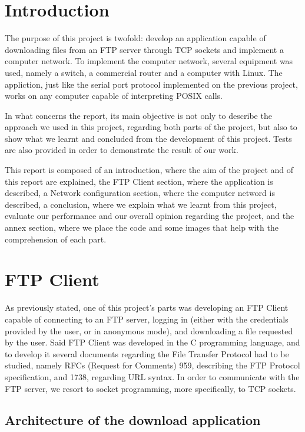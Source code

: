 \documentclass[11pt,a4paper,reqno]{article}
\numberwithin{equation}{section}
\begin{document}
\section{Introduction}

	The purpose of this project is twofold: develop an application capable of downloading files from an FTP server through TCP sockets and implement a computer network. To implement the computer network, several equipment was used, namely a switch, a commercial router and a computer with Linux. The appliction, just like the serial port protocol implemented on the previous project, works on any computer capable of interpreting POSIX calls.
	
	In what concerns the report, its main objective is not only to describe the approach we used in this project, regarding both parts of the project, but also to show what we learnt and concluded from the development of this project. Tests are also provided in order to demonstrate the result of our work.
	
	This report is composed of an introduction, where the aim of the project and of this report are explained, the FTP Client section, where the application is described, a Network configuration section, where the computer netword is described, a conclusion, where we explain what we learnt from this project, evaluate our performance and our overall opinion regarding the project, and the annex section, where we place the code and some images that help with the comprehension of each part.

	\section{FTP Client}

	As previously stated, one of this project’s parts was developing an FTP Client capable of connecting to an FTP server, logging in (either with the credentials provided by the user, or in anonymous mode), and downloading a file requested by the user. Said FTP Client was developed in the C programming language, and to develop it several documents regarding the File Transfer Protocol had to be studied, namely RFCs (Request for Comments) 959, describing the FTP Protocol specification, and 1738, regarding URL syntax. In order to communicate with the FTP server, we resort to socket programming, more specifically, to TCP sockets.

	\subsection{Architecture of the download application}
\end{document}
